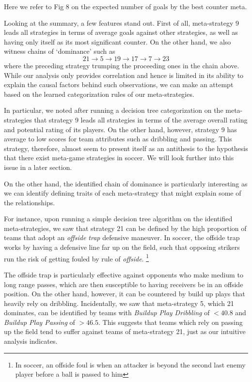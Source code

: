 \documentclass{article}
\begin{document}
Here we refer to Fig 8 on the expected number of goals by the best counter meta. 
\par Looking at the summary, a few features stand out. First of all, meta-strategy 9 leads all strategies in terms of average goals against other strategies, as well as having only itself as its most significant counter. On the other hand, we also witness chains of `dominance' such as
\[
    21 \to 5 \to 19 \to 17 \to 7 \to 23
\]
where the preceding strategy trumping the proceeding ones in the chain above. While our analysis only provides correlation and hence is limited in its ability to explain the causal factors behind such observations, we can make an attempt based on the learned categorization rules of our meta-strategies. 
\par In particular, we noted after running a decision tree categorization on the meta-strategies that strategy 9 leads all strategies in terms of the average overall rating and potential rating of its players. On the other hand, however, strategy 9 has average to low scores for team attributes such as dribbling and passing. This strategy, therefore, almost seem to present itself as an antithesis to the hypothesis that there exist meta-game strategies in soccer. We will look further into this issue in a later section. 
\par On the other hand, the identified chain of dominance is particularly interesting as we can identify defining traits of each meta-strategy that might explain some of the relationships. 
\par For instance, upon running a simple decision tree algorithm on the identified meta-strategies, we saw that strategy 21 can be defined by the high proportion of teams that adopt an \emph{offside trap} defensive maneuver. In soccer, the offside trap works by having a defensive line far up on the field, such that opposing strikers run the risk of getting fouled by rule of \emph{offside}. \footnote{In soccer, an offside foul is when an attacker is beyond the second last enemy player before a ball is passed to him} 
\par The offside trap is particularly effective against opponents who make medium to long range passes, which are then susceptible to having receivers be in an offside position. On the other hand, however, it can be countered by build up plays that heavily rely on dribbling. Incidentally, we saw that meta-strategy 5, which 21 dominates, can be identified by teams with \emph{Buildup Play Dribbling} of $< 40.8$ and \emph{Buildup Play Passing} of $> 46.5$. This suggests that teams which rely on passing up the field tend to suffer against teams of meta-strategy 21, just as our intuitive analysis indicates. 
\end{document}
